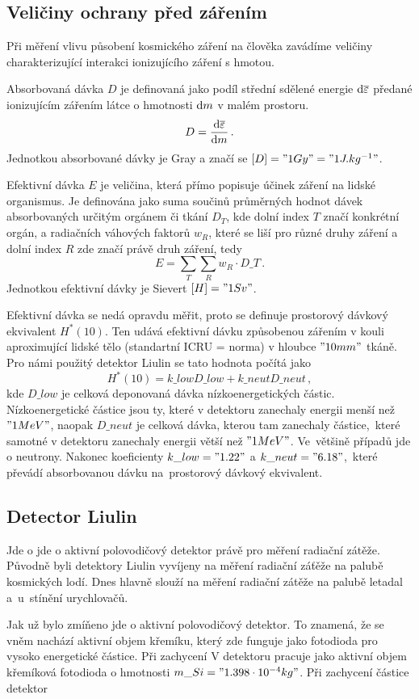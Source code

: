 \documentclass[12pt,a4paper]{article}
\begin{document}
\subsection*{Veličiny ochrany před zářením}
Při měření vlivu působení kosmického záření na člověka zavádíme veličiny
charakterizující interakci ionizujícího záření s hmotou.\par
Absorbovaná dávka $D$ je definovaná jako podíl střední sdělené energie
$\mathrm{d} \overline{\varepsilon}$ předané ionizujícím zářením látce o hmotnosti
$\mathrm{d} m$ v malém prostoru.
$$D=\frac{\mathrm{d} \overline{\varepsilon}}{\mathrm{d} m}\,.$$
Jednotkou absorbované dávky je Gray a značí se ${[D]="1 Gy"="1 J.kg^{-1}"}$.\par
Efektivní dávka $E$ je veličina, která přímo popisuje účinek záření na lidské
organismus. Je definována jako suma součinů průměrných hodnot dávek
absorbovaných určitým orgánem či tkání $D_T$, kde dolní index $T$ značí
konkrétní orgán, a radiačních váhových faktorů $w_R$, které se liší pro různé
druhy záření a dolní index $R$ zde značí právě druh záření, tedy
$$E=\sum_{T}\sum_{R} w_R\cdot D\_{T}\,.$$
Jednotkou efektivní dávky je Sievert ${[H]="1 Sv"}$.\par
Efektivní dávka se nedá opravdu měřit, proto se definuje prostorový dávkový
ekvivalent $ H^\ast(10) $. Ten udává efektivní dávku způsobenou zářením v kouli
aproximující lidské tělo (standartní ICRU = norma) v hloubce $"10 mm"$ tkáně.
Pro námi použitý detektor Liulin se tato hodnota počítá jako
$$H^\ast(10)=k\_{low}D\_{low}+k\_{neut}D\_{neut}\,,$$
kde $D\_{low}$ je celková deponovaná dávka nízkoenergetických částic.
Nízkoenergetické částice jsou ty, které v detektoru zanechaly energii menší než
$ "1 MeV" $, naopak $ D\_{neut} $ je celková dávka, kterou tam zanechaly
částice,~které samotné v detektoru zanechaly energii větší než $ "1 MeV" $.
Ve~většině případů jde o neutrony. Nakonec koeficienty
$ k\_{low}="1.22" $ a $ k\_{neut}="6.18" $,~které převádí absorbovanou dávku
na~prostorový dávkový ekvivalent.\par
\subsection*{Detector Liulin}
Jde o jde o aktivní polovodičový detektor právě pro měření radiační zátěže.
Původně byli detektory Liulin vyvíjeny na měření radiační záťěže na palubě
kosmických lodí. Dnes hlavně slouží na měření radiační zátěže na palubě letadal
a~u~stínění urychlovačů.\par Jak už bylo zmíňeno jde o aktivní polovodičový
detektor. To znamená, že se vněm nachází aktivní objem křemíku, který zde
funguje jako fotodioda pro vysoko energetické částice. Při zachycení %
V detektoru pracuje jako aktivní objem křemíková fotodioda o hmotnosti
$m\_{Si}="1.398\cdot 10^{-4} kg"$. Při zachycení částice detektor
\end{document}
